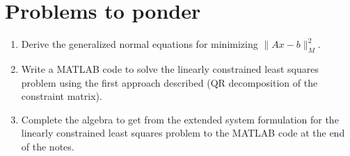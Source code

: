 \documentclass[12pt, leqno]{article}
\begin{document}
\newpage
\section*{Problems to ponder}

\begin{enumerate}
\item Derive the generalized normal equations for minimizing
  $\|Ax-b\|_M^2$.
\item Write a MATLAB code to solve the linearly constrained least
  squares problem using the first approach described (QR decomposition
  of the constraint matrix).
\item Complete the algebra to get from the extended system
  formulation for the linearly constrained least squares problem
  to the MATLAB code at the end of the notes.
\end{enumerate}
\end{document}
